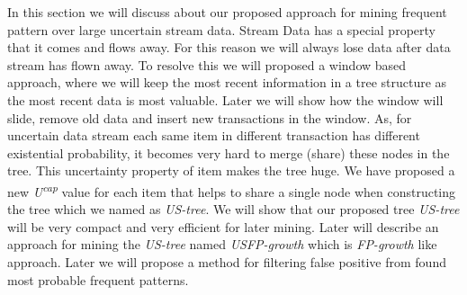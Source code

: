 %
%
\noindent
In this section we will discuss about our proposed approach for mining frequent pattern over large uncertain stream data. Stream Data has a special property that it comes and flows away. For this reason we will always lose data after data stream has flown away. To resolve this we will proposed a window based approach, where we will keep the most recent information in a tree structure as the most recent data is most valuable. Later we will show how the window will slide, remove old data and insert new transactions in the window. As, for uncertain data stream each same item in different transaction has different existential probability, it becomes very hard to merge (share) these nodes in the tree. This uncertainty property of item makes the tree huge. We have proposed a new \emph{U\textsuperscript{cap}} value for each item that helps to share a single node when constructing the tree which we named as \emph{US-tree}. We will show that our proposed tree \emph{US-tree} will be very compact and very efficient for later mining. Later will describe an approach for mining the \emph {US-tree} named \emph{USFP-growth} which is \emph{FP-growth} like approach. Later we will propose a method for filtering false positive from found most probable frequent patterns.
%
%